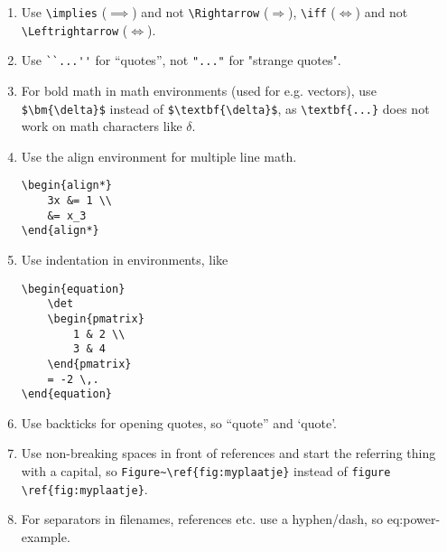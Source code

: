 \documentclass[11pt]{article}
\begin{document}
\begin{enumerate}
        \item Use \verb|\implies| ($\implies$) and not \verb|\Rightarrow| ($\Rightarrow$), \verb|\iff| ($\iff$) and not \verb|\Leftrightarrow| ($\Leftrightarrow$).

        \item Use \verb|``...''| for ``quotes'', not \verb|"..."| for "strange quotes".

        \item For bold math in math environments (used for e.g. vectors), use \verb|$\bm{\delta}$| instead of \verb|$\textbf{\delta}$|, as        \verb|\textbf{...}| does not work on math characters like $\delta$.

        \item Use the align environment for multiple line math.
            \begin{lstlisting}
\begin{align*}
    3x &= 1 \\
    &= x_3
\end{align*}
            \end{lstlisting}

        \item Use indentation in environments, like
            \begin{lstlisting}
\begin{equation}
    \det
    \begin{pmatrix}
        1 & 2 \\
        3 & 4
    \end{pmatrix}
    = -2 \,.
\end{equation}
            \end{lstlisting}
        \item Use backticks for opening quotes, so ``quote'' and `quote'.
        \item Use non-breaking spaces in front of references and start the referring thing with a capital, so \verb|Figure~\ref{fig:myplaatje}| instead of \verb|figure \ref{fig:myplaatje}|.
        \item For separators in filenames, references etc. use a hyphen/dash, so eq:power-example.
    \end{enumerate}
\end{document}
